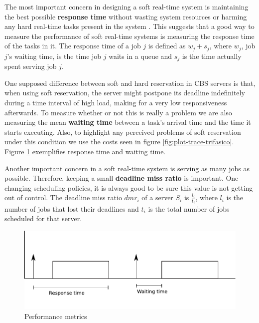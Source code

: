 \documentclass[times, 10pt,twocolumn]{article}
\begin{document}
\label{sec:metrics}

The most important concern in designing a soft real-time system is
maintaining the best possible \textbf{response time} without wasting
system resources or harming any hard real-time tasks present in the
system \cite{buttazzo05:soft}. This suggests that a good way to
measure the performance of soft real-time systems is measuring the
response time of the tasks in it. The response time of a job $j$ is
defined as $w_j + s_j$, where $w_j$, job $j$'s waiting time, is the
time job $j$ waits in a queue and $s_j$ is the time actually spent
serving job $j$.

One supposed difference between soft and hard reservation in CBS
servers is that, when using soft reservation, the server might
postpone its deadline indefinitely during a time interval of high
load, making for a very low responsiveness afterwards. To measure
whether or not this is really a problem we are also measuring the mean
\textbf{waiting time} between a task's arrival time and the time it
starts executing. Also, to highlight any perceived problems of soft
reservation under this condition we use the costs seen in figure
\ref{fig:plot-trace-trifasico}. Figure \ref{fig:metrics} exemplifies
response time and waiting time.

Another important concern in a soft real-time system is serving as
many jobs as possible. Therefore, keeping a small \textbf{deadline
  miss ratio} is important. One changing scheduling policies, it is
always good to be sure this value is not getting out of control. The
deadline miss ratio $dmr_i$ of a server $S_i$ is $\frac{l_i}{t_i}$,
where $l_i$ is the number of jobs that lost their deadlines and $t_i$
is the total number of jobs scheduled for that server.

\begin{figure}[t]
  \centering
  \includegraphics[scale=0.5]{metricas}
  \caption{Performance metrics}
  \label{fig:metrics}
\end{figure}
\end{document}
